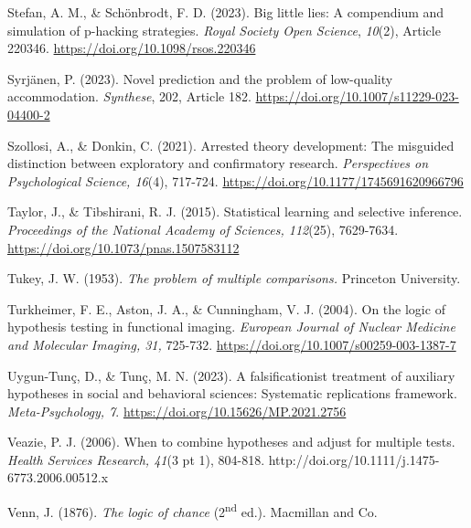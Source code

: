 \documentclass[authordate, empirical]{jote-new-article}
\begin{document}
	Stefan, A. M., \& Schönbrodt, F. D. (2023). Big little lies: A compendium and simulation of p-hacking strategies. \emph{Royal Society Open Science}, \emph{10}(2), Article 220346. \href{https://doi.org/10.1098/rsos.220346}{https://doi.org/10.1098/rsos.220346}



	Syrjänen, P. (2023). Novel prediction and the problem of low-quality accommodation. \emph{Synthese}, 202, Article 182. \href{https://doi.org/10.1007/s11229-023-04400-2}{https://doi.org/10.1007/s11229-023-04400-2}



	Szollosi, A., \& Donkin, C. (2021). Arrested theory development: The misguided distinction between exploratory and confirmatory research. \emph{Perspectives on Psychological Science, 16}(4), 717-724. \href{https://doi.org/10.1177/1745691620966796}{https://doi.org/10.1177/1745691620966796}



	Taylor, J., \& Tibshirani, R. J. (2015). Statistical learning and selective inference. \emph{Proceedings of the National Academy of Sciences, 112}(25), 7629-7634. \href{https://doi.org/10.1073/pnas.1507583112}{https://doi.org/10.1073/pnas.1507583112}



	Tukey, J. W. (1953). \emph{The problem of multiple comparisons.} Princeton University.



	Turkheimer, F. E., Aston, J. A., \& Cunningham, V. J. (2004). On the logic of hypothesis testing in functional imaging. \emph{European Journal of Nuclear Medicine and Molecular Imaging, 31, }725-732. \href{https://doi.org/10.1007/s00259-003-1387-7}{https://doi.org/10.1007/s00259-003-1387-7}



	Uygun-Tunç, D., \& Tunç, M. N. (2023). A falsificationist treatment of auxiliary hypotheses in social and behavioral sciences: Systematic replications framework. \emph{Meta-Psychology, 7}. \href{https://doi.org/10.15626/MP.2021.2756}{https://doi.org/10.15626/MP.2021.2756}



	Veazie, P. J. (2006). When to combine hypotheses and adjust for multiple tests. \emph{Health Services Research, 41}(3 pt 1), 804-818. http://doi.org/10.1111/j.1475-6773.2006.00512.x



	Venn, J. (1876). \emph{The logic of chance} (2\textsuperscript{nd} ed.). Macmillan and Co.
\end{document}
